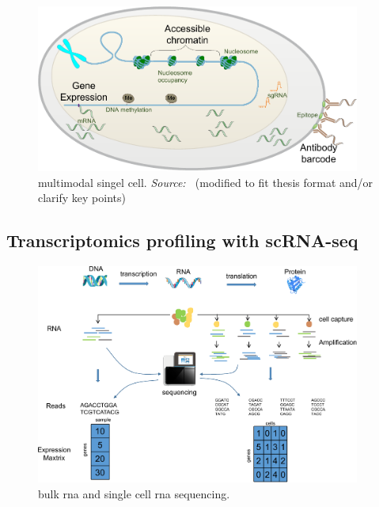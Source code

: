 \begin{figure}[!ht]
	\centering
	\includegraphics[width=0.95\textwidth]{multimodal-single-cell/fig}
	\vspace{0.1cm}
	\caption[mulitmodal single celll.]{multimodal singel cell. \emph{Source: ~\citep{zhu2020single}}(modified to fit thesis format and/or clarify key points)}
	\label{fig:multimodal_single_cell}
\end{figure}



\subsection{Transcriptomics profiling with scRNA-seq}

\begin{figure}[!ht]
	\centering
	\includegraphics[width=0.95\textwidth]{rna_scRNA/fig}
	\vspace{0.1cm}
	\caption[bulk rna and single cell rna sequencing.]{bulk rna and single cell rna sequencing.}
	\label{fig:rna_scRNA}
\end{figure}


